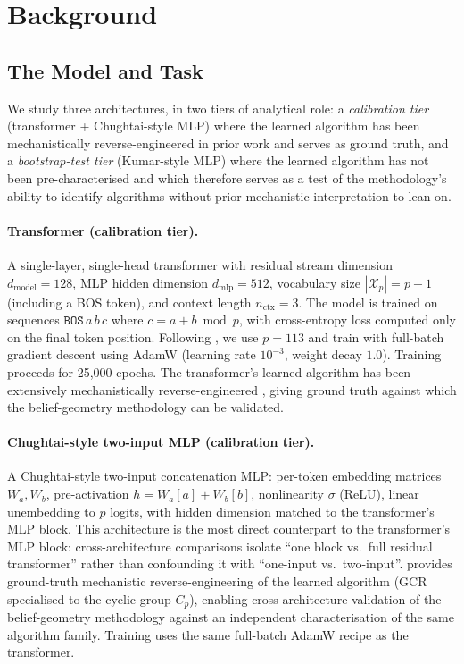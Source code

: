 \documentclass[11pt,a4paper]{article}
\begin{document}
\section{Background}

\subsection{The Model and Task}\label{sec:bg_model}

We study three architectures, in two tiers of analytical role: a \emph{calibration tier} (transformer + Chughtai-style MLP) where the learned algorithm has been mechanistically reverse-engineered in prior work and serves as ground truth, and a \emph{bootstrap-test tier} (Kumar-style MLP) where the learned algorithm has not been pre-characterised and which therefore serves as a test of the methodology's ability to identify algorithms without prior mechanistic interpretation to lean on.

\paragraph{Transformer (calibration tier).} A single-layer, single-head transformer with residual stream dimension $d_{\mathrm{model}} = 128$, MLP hidden dimension $d_{\mathrm{mlp}} = 512$, vocabulary size $|\mathcal{X}_p| = p + 1$ (including a BOS token), and context length $n_{\mathrm{ctx}} = 3$. The model is trained on sequences $\texttt{BOS}\, a\, b\, c$ where $c = a + b \bmod p$, with cross-entropy loss computed only on the final token position. Following \citet{power2022grokking}, we use $p = 113$ and train with full-batch gradient descent using AdamW (learning rate $10^{-3}$, weight decay $1.0$). Training proceeds for 25,000 epochs. The transformer's learned algorithm has been extensively mechanistically reverse-engineered \citep{nanda2023progress, chughtai2023toy, yip2024modular, wu2024unified, poncini2025compmech}, giving ground truth against which the belief-geometry methodology can be validated.

\paragraph{Chughtai-style two-input MLP (calibration tier).} A Chughtai-style \citep{chughtai2023toy} two-input concatenation MLP: per-token embedding matrices $W_a, W_b$, pre-activation $h = W_a[a] + W_b[b]$, nonlinearity $\sigma$ (ReLU), linear unembedding to $p$ logits, with hidden dimension matched to the transformer's MLP block. This architecture is the most direct counterpart to the transformer's MLP block: cross-architecture comparisons isolate ``one block vs.\ full residual transformer'' rather than confounding it with ``one-input vs.\ two-input''. \citet{chughtai2023toy} provides ground-truth mechanistic reverse-engineering of the learned algorithm (GCR specialised to the cyclic group $C_p$), enabling cross-architecture validation of the belief-geometry methodology against an independent characterisation of the same algorithm family. Training uses the same full-batch AdamW recipe as the transformer.
\end{document}
